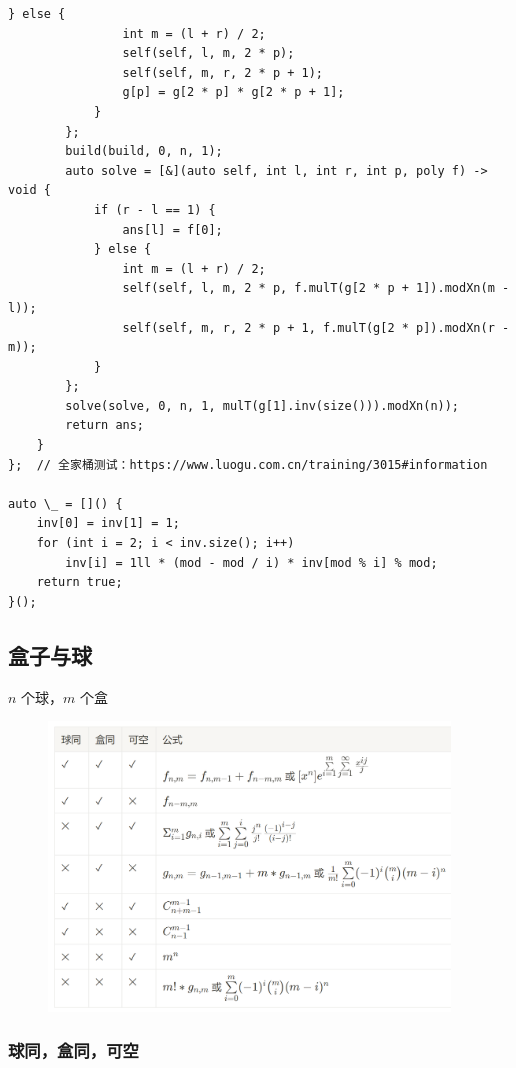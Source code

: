 \documentclass[UTF8]{ctexart}
\begin{document}
\begin{sloppypar}
\begin{lstlisting}[style=cpp]
            } else {
                int m = (l + r) / 2;
                self(self, l, m, 2 * p);
                self(self, m, r, 2 * p + 1);
                g[p] = g[2 * p] * g[2 * p + 1];
            }
        };
        build(build, 0, n, 1);
        auto solve = [&](auto self, int l, int r, int p, poly f) -> void {
            if (r - l == 1) {
                ans[l] = f[0];
            } else {
                int m = (l + r) / 2;
                self(self, l, m, 2 * p, f.mulT(g[2 * p + 1]).modXn(m - l));
                self(self, m, r, 2 * p + 1, f.mulT(g[2 * p]).modXn(r - m));
            }
        };
        solve(solve, 0, n, 1, mulT(g[1].inv(size())).modXn(n));
        return ans;
    }
};  // 全家桶测试：https://www.luogu.com.cn/training/3015#information

auto \_ = []() {
    inv[0] = inv[1] = 1;
    for (int i = 2; i < inv.size(); i++)
        inv[i] = 1ll * (mod - mod / i) * inv[mod % i] % mod;
    return true;
}();
\end{lstlisting}
\subsection{盒子与球}

$n$ 个球，$m$ 个盒

\begin{figure}[H]
    \flushleft
    \includegraphics[width=0.95\textwidth]{box-and-ball.png}
    \label{fig:left}
\end{figure}

\subsubsection{球同，盒同，可空}


\end{sloppypar}
\end{document}
